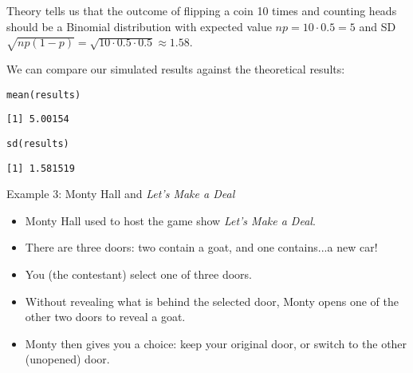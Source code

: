 \documentclass{beamer}\usepackage[]{graphicx}\usepackage[]{color}
\makeatletter
\newcommand{\hlstd}[1]{\textcolor[rgb]{1,0.894,0.769}{#1}}%
\newcommand{\hlkwd}[1]{\textcolor[rgb]{1,0.78,0.769}{#1}}%
\newenvironment{kframe}{%
 \def\at@end@of@kframe{}%
 \ifinner\ifhmode%
  \def\at@end@of@kframe{\end{minipage}}%
  \begin{minipage}{\columnwidth}%
 \fi\fi%
 \def\FrameCommand##1{\hskip\@totalleftmargin \hskip-\fboxsep
 \colorbox{shadecolor}{##1}\hskip-\fboxsep
     \hskip-\linewidth \hskip-\@totalleftmargin \hskip\columnwidth}%
 \MakeFramed {\advance\hsize-\width
   \@totalleftmargin\z@ \linewidth\hsize
   \@setminipage}}%
 {\par\unskip\endMakeFramed%
 \at@end@of@kframe}
\newenvironment{knitrout}{}{} %
\makeatother
\begin{document}
\begin{darkframes}
\begin{frame}[fragile]
\begin{knitrout}
\end{knitrout}
    \end{frame}

    \begin{frame}[fragile]
      Theory tells us that the outcome of flipping a coin 10 times and counting heads should be a Binomial distribution with expected value $np=10\cdot 0.5=5$ and SD $\sqrt{np(1-p)}=\sqrt{10\cdot 0.5\cdot 0.5} \approx 1.58$.

      We can compare our simulated results against the theoretical results:
\begin{knitrout}
\begin{kframe}
\begin{alltt}
\hlkwd{mean}\hlstd{(results)}
\end{alltt}
\begin{verbatim}
[1] 5.00154
\end{verbatim}
\begin{alltt}
\hlkwd{sd}\hlstd{(results)}
\end{alltt}
\begin{verbatim}
[1] 1.581519
\end{verbatim}
\end{kframe}
\end{knitrout}
      \lc
    \end{frame}

    \begin{frame}
    \end{frame}

    \begin{frame}
    \end{frame}

    \begin{frame}
    \end{frame}

    \begin{frame}
    \end{frame}


    \begin{frame}{Example 3: Monty Hall and \emph{Let's Make a Deal}}
      \begin{itemize}[<+->]
        \item Monty Hall used to host the game show \emph{Let's Make a Deal}.
        \item There are three doors: two contain a goat, and one contains...\pause \alert{a new car}!
        \item You (the contestant) select one of three doors.
        \item Without revealing what is behind the selected door, Monty opens one of the other two doors to reveal a goat.
        \item Monty then gives you a choice: keep your original door, or switch to the other (unopened) door.
      \end{itemize}
    \end{frame}


\end{darkframes}
\end{document}
